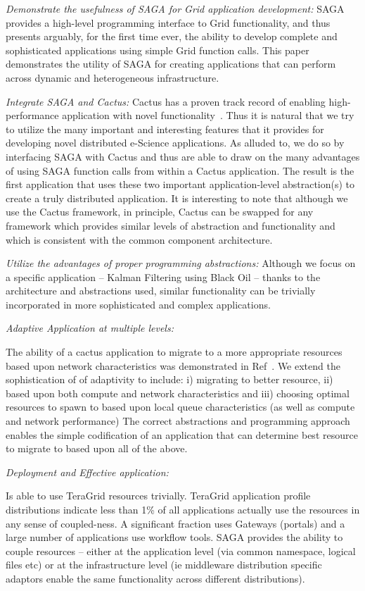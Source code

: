\documentclass[conference,final]{IEEEtran}
\begin{document}
{\it Demonstrate the usefulness of SAGA for Grid application
  development:} SAGA provides a high-level programming interface to
Grid functionality, and thus presents arguably, for the first time
ever, the ability to develop complete and sophisticated applications
using simple Grid function calls.  This paper demonstrates the utility
of SAGA for creating applications that can perform across dynamic and
heterogeneous infrastructure.

{\it Integrate SAGA and Cactus:} Cactus has a proven track record of
enabling high-performance application with novel
functionality~\cite{Cactus_GordonBell, Sidney_Fernbach}.  Thus it is
natural that we try to utilize the many important and interesting
features that it provides for developing novel distributed e-Science
applications. As alluded to, we do so by interfacing SAGA with Cactus
and thus are able to draw on the many advantages of using SAGA
function calls from within a Cactus application.  The result is the
first application that uses these two important application-level
abstraction(s) to create a truly distributed application. It is
interesting to note that although we use the Cactus framework, in
principle, Cactus can be swapped for any framework which provides
similar levels of abstraction and functionality and which is
consistent with the common component architecture.

{\it Utilize the advantages of proper programming abstractions:}
Although we focus on a specific application -- Kalman Filtering using
Black Oil -- thanks to the architecture and abstractions used, similar
functionality can be trivially incorporated in more sophisticated and
complex applications.


{\it Adaptive Application at multiple levels:}

The ability of a cactus application to migrate to a more appropriate
resources based upon network characteristics was demonstrated in
Ref~\cite{escience03}.  We extend the sophistication of of adaptivity
to include: i) migrating to better resource, ii) based upon both
compute and network characteristics and iii) choosing optimal
resources to spawn to based upon local queue characteristics (as well
as compute and network performance) The correct abstractions and
programming approach enables the simple codification of an application
that can determine best resource to migrate to based upon all of the
above.

{\it Deployment and Effective application:} 

Is able to use TeraGrid resources trivially.  TeraGrid application
profile distributions indicate less than 1\% of all applications
actually use the resources in any sense of coupled-ness.  A
significant fraction uses Gateways (portals) and a large number of
applications use workflow tools. SAGA provides the ability to couple
resources -- either at the application level (via common namespace,
logical files etc) or at the infrastructure level (ie middleware
distribution specific adaptors enable the same functionality across
different distributions).
\end{document}
